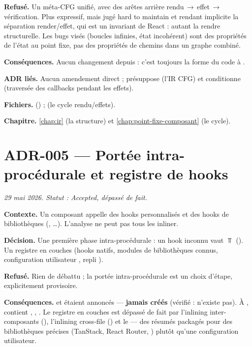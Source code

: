 \textbf{Refusé.} Un méta-CFG unifié, avec des arêtes arrière
rendu\,$\to$\,effet\,$\to$\,vérification. Plus expressif, mais jugé
\og hard to maintain\fg{} et rendant implicite la séparation render/effet, qui
est un invariant de React : autant la rendre structurelle. Les bugs visés
(boucles infinies, état incohérent) sont des propriétés de l'état au point
fixe, pas des propriétés de chemins dans un graphe combiné.

\textbf{Conséquences.} Aucun changement depuis : c'est toujours la forme du
code à \code{\snapshotCommit}.

\textbf{ADR liés.} Aucun amendement direct ; présuppose  (l'IR CFG) et
conditionne  (traversée des callbacks pendant les effets).

\textbf{Fichiers.}  () ;
 (le cycle rendu/effets).

\textbf{Chapitre.} \cref{chap:ir} (la structure) et \cref{chap:point-fixe-composant}
(le cycle).

\section{ADR-005 --- Portée intra-procédurale et registre de hooks}
\label{adr:5}
\noindent\textit{29 mai 2026. Statut : Accepted, dépassé de fait.}

\textbf{Contexte.} Un composant appelle des hooks personnalisés et des hooks de
bibliothèques (, \ldots). L'analyse ne
peut pas tous les inliner.

\textbf{Décision.} Une première phase intra-procédurale : un hook inconnu
vaut $\Top$ (). Un registre  en couches
(hooks natifs, modules de bibliothèques connus, configuration utilisateur
, repli ).

\textbf{Refusé.} Rien de débattu ; la portée intra-procédurale est un choix
d'étape, explicitement provisoire.

\textbf{Conséquences.}  et 
étaient annoncés — \textbf{jamais créés} (vérifié : 
n'existe pas). À \code{\snapshotCommit},  contient
, , . Le registre en couches est
dépassé de fait par l'inlining inter-composants (), l'inlining
cross-file () et le  — des résumés packagés pour
des bibliothèques précises (TanStack, React Router, )
plutôt qu'une configuration utilisateur.

